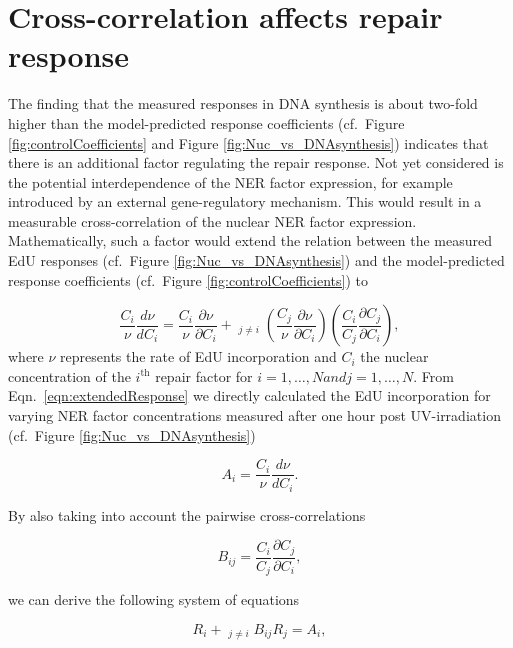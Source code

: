 \section{Cross-correlation affects repair response}
\label{sec:crossCorelResponse}
The finding that the measured responses in DNA synthesis is about two-fold higher than the model-predicted response coefficients (cf.\ Figure \ref{fig:controlCoefficients} and Figure \ref{fig:Nuc_vs_DNAsynthesis}) indicates that there is an additional factor regulating the repair response. Not yet considered is the potential interdependence of the NER factor expression, for example introduced by an external gene-regulatory mechanism. This would result in a measurable cross-correlation of the nuclear NER factor expression. Mathematically, such a factor would extend the relation between the measured EdU responses (cf.\ Figure \ref{fig:Nuc_vs_DNAsynthesis}) and the model-predicted response coefficients (cf.\ Figure \ref{fig:controlCoefficients}) to 

\begin{equation}
\frac{C_i}{\nu}\frac{d \nu}{d C_i} = \frac{C_i}{\nu}\frac{\partial \nu}{\partial C_i} + \mathop{\sum_{j=1}}_{j \neq i} \left( \frac{C_j}{\nu}\frac{\partial \nu}{\partial C_i}\right) \left(\frac{C_i}{C_j}\frac{\partial C_j}{\partial C_i}\right), 
\label{eqn:extendedResponse}
\end{equation}    
where $\nu$ represents the rate of EdU incorporation and $C_i$ the nuclear concentration of the $i^{\text{th}}$ repair factor for $i = 1,\ldots,N and j = 1,\ldots,N$. From Eqn.\ \ref{eqn:extendedResponse} we directly calculated the EdU incorporation for varying NER factor concentrations measured after one hour post UV-irradiation (cf.\ Figure \ref{fig:Nuc_vs_DNAsynthesis})

\begin{equation}
A_i = \frac{C_i}{\nu}\frac{d \nu}{d C_i}. \nonumber
\end{equation}

By also taking into account the pairwise cross-correlations

\begin{equation}
B_{ij} = \frac{C_i}{C_j}\frac{\partial C_j}{\partial C_i}, \nonumber
\end{equation}

we can derive the following system of equations


\begin{equation}
R_i + \mathop{\sum_{j = 1}}_{j\neq i} B_{ij}R_j = A_i,
\label{eqn:linearEqnSystem}
\end{equation}

